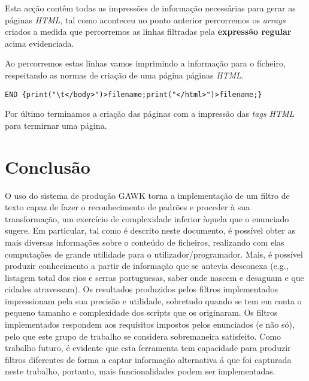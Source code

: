 \documentclass{report}
\begin{document}
    Esta acção contêm todas as impressões de informação necessárias para gerar as páginas \textit{HTML}, tal como aconteceu no ponto anterior percorremos os \textit{arrays} criados a medida que percorremos as linhas filtradas pela \textbf{expressão regular} acima evidenciada. 

    Ao percorremos estas linhas vamos imprimindo a informação para o ficheiro, respeitando as normas de criação de uma página páginas \textit{HTML}. 

\begin{verbatim}
END {print("\t</body>")>filename;print("</html>")>filename;}
\end{verbatim}

    Por último terminamos a criação das páginas com a impressão das \textit{tags HTML} para termirnar uma página. 


\chapter{Conclusão} \label{concl}

    O uso do sistema de produção GAWK torna a implementação de um filtro de texto capaz de fazer o reconhecimento de padrões e proceder à sua transformação, um exercício de complexidade inferior àquela que o enunciado sugere. Em particular, tal como é descrito neste documento, é possível obter as mais diversas informações sobre o conteúdo de ficheiros, realizando com elas computações de grande utilidade para o utilizador/programador. Mais, é possível produzir conhecimento a partir de informação que se antevia desconexa (e.g., listagem total dos rios e serras portuguesas, saber onde nascem e desaguam e que cidades atravessam). Os resultados produzidos pelos filtros implementados impressionam pela sua precisão e utilidade, sobretudo quando se tem em conta o pequeno tamanho e complexidade dos scripts que os originaram. Os filtros implementados respondem aos requisitos impostos pelos enunciados (e não só), pelo que este grupo de trabalho se considera sobremaneira satisfeito. Como trabalho futuro, é evidente que esta ferramenta tem capacidade para produzir filtros diferentes de forma a captar informação alternativa á que foi capturada neste trabalho, portanto, mais funcionalidades podem ser implementadas.



\end{document}
